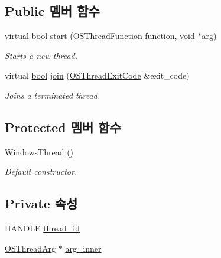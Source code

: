 \subsection*{Public 멤버 함수}
\begin{DoxyCompactItemize}
\item 
virtual \hyperlink{avb__gptp_8h_af6a258d8f3ee5206d682d799316314b1}{bool} \hyperlink{class_windows_thread_affcc04a68e6b3779523a4f1183ba03e9}{start} (\hyperlink{avbts__osthread_8hpp_a68966f4aba46c269e8341073e7787d34}{O\+S\+Thread\+Function} function, void $\ast$arg)
\begin{DoxyCompactList}\small\item\em Starts a new thread. \end{DoxyCompactList}\item 
virtual \hyperlink{avb__gptp_8h_af6a258d8f3ee5206d682d799316314b1}{bool} \hyperlink{class_windows_thread_a8f72858c99108009544ce8b3fcbfc7fd}{join} (\hyperlink{avbts__osthread_8hpp_a82108124541f8ae837064a49057d2f82}{O\+S\+Thread\+Exit\+Code} \&exit\+\_\+code)
\begin{DoxyCompactList}\small\item\em Joins a terminated thread. \end{DoxyCompactList}\end{DoxyCompactItemize}
\subsection*{Protected 멤버 함수}
\begin{DoxyCompactItemize}
\item 
\hyperlink{class_windows_thread_acaa1f7a089f05a90d5c0c2a62854e33d}{Windows\+Thread} ()
\begin{DoxyCompactList}\small\item\em Default constructor. \end{DoxyCompactList}\end{DoxyCompactItemize}
\subsection*{Private 속성}
\begin{DoxyCompactItemize}
\item 
H\+A\+N\+D\+LE \hyperlink{class_windows_thread_a9771b03f8c67546b28d7aaad3b8e53ee}{thread\+\_\+id}
\item 
\hyperlink{struct_o_s_thread_arg}{O\+S\+Thread\+Arg} $\ast$ \hyperlink{class_windows_thread_af6992b2f52fbe4a2362f1f0a81371185}{arg\+\_\+inner}
\end{DoxyCompactItemize}
